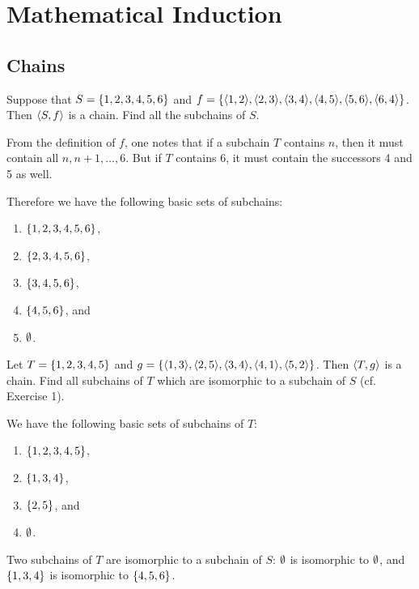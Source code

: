 \chapter{Mathematical Induction}
\section{Chains}
\begin{exercise}
Suppose that $S = \left\{1, 2,3,4,5, 6\right\}$ and
$f = \set{\aprn{1,2},\aprn{2,3},\aprn{3,4},\aprn{4,5}, \aprn{5,6},\aprn{6,4}}$.
Then $\left\langle S, f\right\rangle$ is a chain. Find all the subchains of $S$.
\end{exercise}

\begin{solution}
From the definition of $f$, one notes that if a subchain $T$ contains $n$,
then it must contain all $n,n+1,\dots,6$. But if $T$ contains 6, it must contain the
successors 4 and 5 as well.

Therefore we have the following basic sets of subchains: 
\begin{enumerate}[label=(\roman*)]
    \item $\left\{1, 2,3,4,5, 6\right\}$,
    \item $\left\{2,3,4,5, 6\right\}$,
    \item $\left\{3,4,5, 6\right\}$,
    \item $\left\{4,5, 6\right\}$, and
    \item $\emptyset$.
\end{enumerate}
\end{solution}

\begin{exercise}
Let $T =\left\{1, 2,3, 4,5\right\}$ and $g = \set{\aprn{1,3},\aprn{2,5},\aprn{3,4}, \aprn{4,1},\aprn{5,2}}$.
Then $\left\langle T,g\right\rangle$ is a chain. Find all subchains of $T$ which are isomorphic to a
subchain of $S$ (cf. Exercise 1).
\end{exercise}

\begin{solution}
We have the following basic sets of subchains of $T$: 
\begin{enumerate}[label=(\roman*)]
    \item $\left\{1,2,3,4,5\right\}$,
    \item $\left\{1,3,4\right\}$,
    \item $\left\{2,5\right\}$, and
    \item $\emptyset$.
\end{enumerate}
Two subchains of $T$ are isomorphic to a subchain of $S$: $\emptyset$ is isomorphic to $\emptyset$, and $\left\{1,3,4\right\}$
is isomorphic to $\left\{4,5, 6\right\}$. 
\end{solution}

